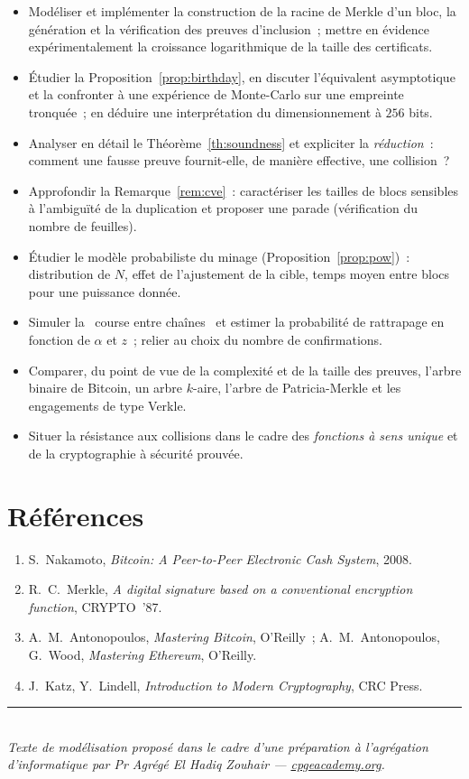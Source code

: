 \documentclass[11pt,a4paper]{article}
\theoremstyle{definition}\newtheorem{definition}{Définition}
\theoremstyle{plain}\newtheorem{theoreme}{Théorème}\newtheorem{proposition}{Proposition}
\theoremstyle{remark}\newtheorem{remarque}{Remarque}
\begin{document}
\begin{itemize}[nosep,leftmargin=1.3em]
  \item Modéliser et implémenter la construction de la racine de Merkle d'un bloc, la génération
        et la vérification des preuves d'inclusion~; mettre en évidence expérimentalement la
        croissance logarithmique de la taille des certificats.
  \item Étudier la Proposition~\ref{prop:birthday}, en discuter l'équivalent asymptotique et la
        confronter à une expérience de Monte-Carlo sur une empreinte tronquée~; en déduire une
        interprétation du dimensionnement à $256$ bits.
  \item Analyser en détail le Théorème~\ref{th:soundness} et expliciter la \emph{réduction}~:
        comment une fausse preuve fournit-elle, de manière effective, une collision~?
  \item Approfondir la Remarque~\ref{rem:cve}~: caractériser les tailles de blocs sensibles à
        l'ambiguïté de la duplication et proposer une parade (vérification du nombre de feuilles).
  \item Étudier le modèle probabiliste du minage (Proposition~\ref{prop:pow})~: distribution de
        $N$, effet de l'ajustement de la cible, temps moyen entre blocs pour une puissance donnée.
  \item Simuler la \guillemotleft~course entre chaînes~\guillemotright{} et estimer la probabilité
        de rattrapage en fonction de $\alpha$ et $z$~; relier au choix du nombre de confirmations.
  \item Comparer, du point de vue de la complexité et de la taille des preuves, l'arbre binaire de
        Bitcoin, un arbre $k$-aire, l'arbre de Patricia-Merkle et les engagements de type Verkle.
  \item Situer la résistance aux collisions dans le cadre des \emph{fonctions à sens unique} et de
        la cryptographie à sécurité prouvée.
\end{itemize}

\section*{Références}
\begin{enumerate}[nosep,leftmargin=1.6em]
  \item S.~Nakamoto, \emph{Bitcoin: A Peer-to-Peer Electronic Cash System}, 2008.
  \item R.~C.~Merkle, \emph{A digital signature based on a conventional encryption function},
        CRYPTO~'87.
  \item A.~M.~Antonopoulos, \emph{Mastering Bitcoin}, O'Reilly~; A.~M.~Antonopoulos, G.~Wood,
        \emph{Mastering Ethereum}, O'Reilly.
  \item J.~Katz, Y.~Lindell, \emph{Introduction to Modern Cryptography}, CRC Press.
\end{enumerate}

\vfill
\noindent\rule{\linewidth}{0.3pt}\\
{\footnotesize\itshape Texte de modélisation proposé dans le cadre d'une préparation à
l'agrégation d'informatique par Pr Agrégé El Hadiq Zouhair --- \href{https://cpgeacademy.org}{cpgeacademy.org}.}
\end{document}
